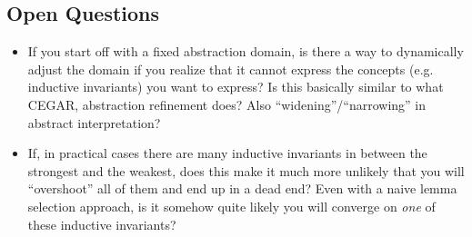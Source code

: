 \documentclass[10pt]{article}
\begin{document}


\subsection*{Open Questions}

\begin{itemize}
    \item If you start off with a fixed abstraction domain, is there a way to dynamically adjust the domain if you realize that it cannot express the concepts (e.g. inductive invariants) you want to express? Is this basically similar to what CEGAR, abstraction refinement does? Also ``widening''/``narrowing'' in abstract interpretation?
    \item If, in practical cases there are many inductive invariants in between the strongest and the weakest, does this make it much more unlikely that you will ``overshoot'' all of them and end up in a dead end? Even with a naive lemma selection approach, is it somehow quite likely you will converge on \textit{one} of these inductive invariants?
\end{itemize}


% 
% 

\end{document}
